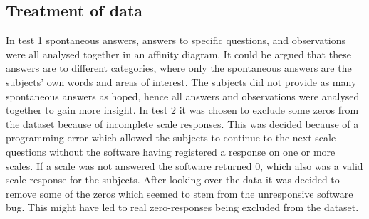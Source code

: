 \subsection{Treatment of data}
In test 1 spontaneous answers, answers to specific questions, and observations were all analysed together in an affinity diagram. It could be argued that these answers are to different categories, where only the spontaneous answers are the subjects' own words and areas of interest. The subjects did not provide as many spontaneous answers as hoped, hence all answers and observations were analysed together to gain more insight. 
In test 2 it was chosen to exclude some zeros from the dataset because of incomplete scale responses. This was decided because of a programming error which allowed the subjects to continue to the next scale questions without the software having registered a response on one or more scales. If a scale was not answered the software returned 0, which also was a valid scale response for the subjects. After looking over the data it was decided to remove some of the zeros which seemed to stem from the unresponsive software bug. This might have led to real zero-responses being excluded from the dataset.